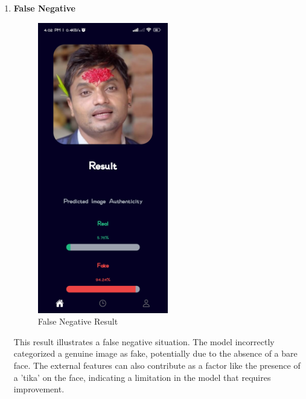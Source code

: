 \begin{enumerate}
    \item \textbf{False Negative}
          \\
          \begin{figure}[ht]
              \centering
              \includegraphics[height =5in ]{img/dashainResult.jpg}
              \caption{{False Negative Result}}
          \end{figure}

          This result illustrates a false negative situation. The model incorrectly categorized a genuine image as fake, potentially due to the absence of a bare face. The external features can also contribute as a factor like the presence of a 'tika' on the face, indicating a limitation in the model that requires improvement.

          \newpage

\end{enumerate}

